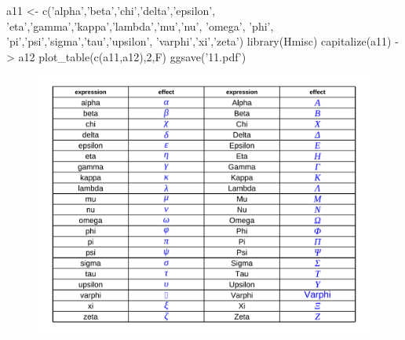 \documentclass[10 pt,landscape]{article}
\begin{document}
\begin{multicols*}{3}
      \begin{R}
a11 <- c('alpha','beta','chi','delta','epsilon',
         'eta','gamma','kappa','lambda','mu','nu',
          'omega',
          'phi', 'pi','psi','sigma','tau','upsilon',
         'varphi','xi','zeta')
library(Hmisc)
capitalize(a11) -> a12
plot_table(c(a11,a12),2,F)
ggsave('11.pdf')
          \end{R}
          
          \begin{figure}[H]
      \centering
        \includegraphics[width = 1\linewidth]{11.pdf}
      \end{figure}
      
      
\end{multicols*}
\end{document}
